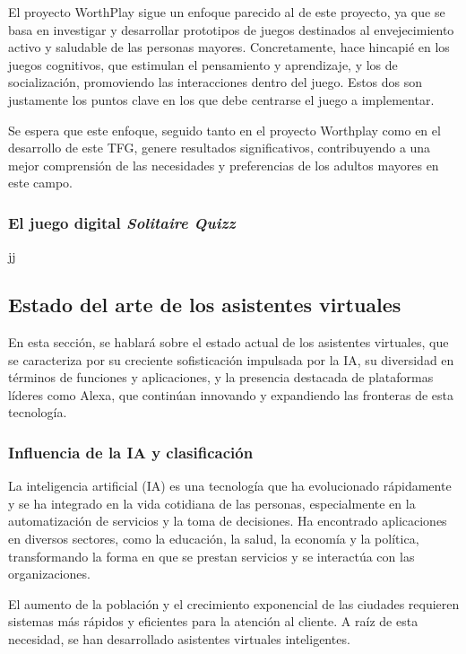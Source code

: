 El proyecto WorthPlay sigue un enfoque parecido al de este proyecto, ya que se basa en investigar y desarrollar prototipos de juegos destinados al envejecimiento activo y saludable de las personas mayores. Concretamente, hace hincapié en los juegos cognitivos, que estimulan el pensamiento y aprendizaje, y los de socialización, promoviendo las interacciones dentro del juego. Estos dos son justamente los puntos clave en los que debe centrarse el juego a implementar.

Se espera que este enfoque, seguido tanto en el proyecto Worthplay como en el desarrollo de este TFG, genere resultados significativos, contribuyendo a una mejor comprensión de las necesidades y preferencias de los adultos mayores en este campo.

\subsubsection{El juego digital \textit{Solitaire Quizz}}

jj

\subsection{Estado del arte de los asistentes virtuales}

En esta sección, se hablará sobre el estado actual de los asistentes virtuales, que se caracteriza por su creciente sofisticación impulsada por la IA, su diversidad en términos de funciones y aplicaciones, y la presencia destacada de plataformas líderes como Alexa, que continúan innovando y expandiendo las fronteras de esta tecnología.

\subsubsection{Influencia de la IA y clasificación}

La inteligencia artificial (IA) es una tecnología que ha evolucionado rápidamente y se ha integrado en la vida cotidiana de las personas, especialmente en la automatización de servicios y la toma de decisiones. Ha encontrado aplicaciones en diversos sectores, como la educación, la salud, la economía y la política, transformando la forma en que se prestan servicios y se interactúa con las organizaciones.

El aumento de la población y el crecimiento exponencial de las ciudades requieren sistemas más rápidos y eficientes para la atención al cliente. A raíz de esta necesidad, se han desarrollado asistentes virtuales inteligentes.

